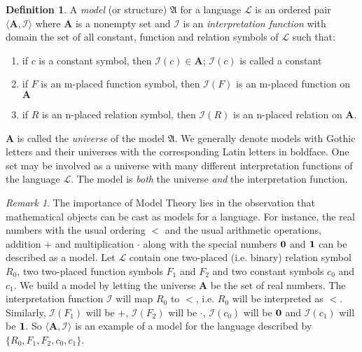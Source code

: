 \documentclass[titlepage, oneside]{amsbook}
\theoremstyle{plain}
\theoremstyle{definition}
\newtheorem{definition}{Definition}
\theoremstyle{remark}
\newtheorem*{rem}{Remark}
\newcommand{\lan}{\ensuremath{\mathcal{L}}}
\newcommand{\ba}{\ensuremath{\mathbf{A}}}
\begin{document}
\begin{definition}
%
 A \emph{model} (or structure) $\mathfrak{A}$ for a 
language $\mathcal{L}$ is an ordered pair $\langle \mathbf{A} 
,\mathcal{I} \rangle$
where $\mathbf{A}$ is a nonempty set and $\mathcal{I}$ is an \emph{interpretation 
function} with domain the set of all constant, function and relation 
symbols of $\mathcal{L}$ such that:

\begin{enumerate}

\item if $c$ is a constant symbol, then $\mathcal{I} (c) \in 
\mathbf{A}$; $\mathcal{I}(c)$ is called a 
constant 

\item if $F$ is an m-placed  function symbol, then 
$\mathcal{I}(F)$ is an m-placed function on $\mathbf{A}$

\item if $R$ is an n-placed relation symbol, then $\mathcal{I}(R)$ is an 
n-placed relation on $\mathbf{A}$.

\end{enumerate}

$\ba$ is called the \emph{universe} of the model $\mathfrak{A}$.  We
generally denote models with Gothic letters and their universes with
the
corresponding Latin letters in boldface.  One set
may be involved as a universe with many diff\-erent interpretation
functions of the 
language $\mathcal{L}$. The model is \emph{both} the universe
\emph{and} the interpretation function.          

\end{definition}

\begin{rem}  The importance of Model Theory lies in the observation that
mathematical objects can be cast as models for a language.  For instance,
the real numbers with the usual ordering $\pmb{<}$ and the usual
arithmetic operations, addition $\pmb{+}$ and multiplication $\pmb{\cdot}$
along with the special numbers $\bf{0}$ and $\bf{1}$ can be described
as a
model.  Let $\lan$ contain one two-placed (i.e. binary) relation symbol
$R_0$, two two-placed function symbols $F_1$ and $F_2$ and two constant
symbols $c_0$ and $c_1$.  We build a model by letting the universe $\ba$
be the set of real numbers.  The interpretation function $\mathcal I$ will
map $R_0$ to $\pmb{<}$, i.e. $R_0$ will be interpreted as $\pmb{<}$.
Similarly, $\mathcal I (F_1)$ will be $\pmb{+}$, $\mathcal I (F_2)$ will
be $\pmb{\cdot}$, $\mathcal I (c_0)$ will be $\bf{0}$ and $\mathcal
I(c_1)$ will be $\bf 1$.  So $\langle \ba , \mathcal I \rangle$ is an
example of a model for the language described by 
$\{ R_0 , F_1 , F_2 , c_0 ,c_1 \}$.

\end{rem}
\end{document}
